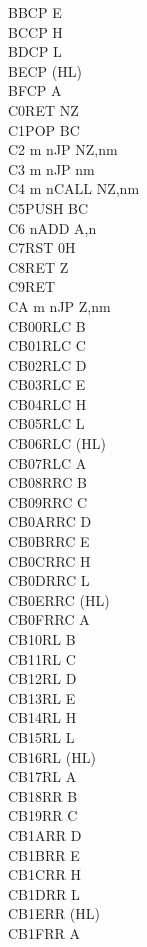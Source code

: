 \documentclass[12pt,twoside,openright,a4paper]{book}
\begin{document}
\begin{multicols}{3}
{\begin{tabbing}
	BB\>CP E\\
	BC\>CP H\\
	BD\>CP L\\
	BE\>CP (HL)\\
	BF\>CP A\\
	C0\>RET NZ\\
	C1\>POP BC\\
	C2 m n\>JP NZ,nm\\
	C3 m n\>JP nm\\
	C4 m n\>CALL NZ,nm\\
	C5\>PUSH BC\\
	C6 n\>ADD A,n\\
	C7\>RST 0H\\
	C8\>RET Z\\
	C9\>RET\\
	CA m n\>JP Z,nm\\
	CB00\>RLC B\\
	CB01\>RLC C\\
	CB02\>RLC D\\
	CB03\>RLC E\\
	CB04\>RLC H\\
	CB05\>RLC L\\
	CB06\>RLC (HL)\\
	CB07\>RLC A\\
	CB08\>RRC B\\
	CB09\>RRC C\\
	CB0A\>RRC D\\
	CB0B\>RRC E\\
	CB0C\>RRC H\\
	CB0D\>RRC L\\
	CB0E\>RRC (HL)\\
	CB0F\>RRC A\\
	CB10\>RL B\\
	CB11\>RL C\\
	CB12\>RL D\\
	CB13\>RL E\\
	CB14\>RL H\\
	CB15\>RL L\\
	CB16\>RL (HL)\\
	CB17\>RL A\\
	CB18\>RR B\\
	CB19\>RR C\\
	CB1A\>RR D\\
	CB1B\>RR E\\
	CB1C\>RR H\\
	CB1D\>RR L\\
	CB1E\>RR (HL)\\
	CB1F\>RR A\\

\end{tabbing}}
\end{multicols}
\end{document}
